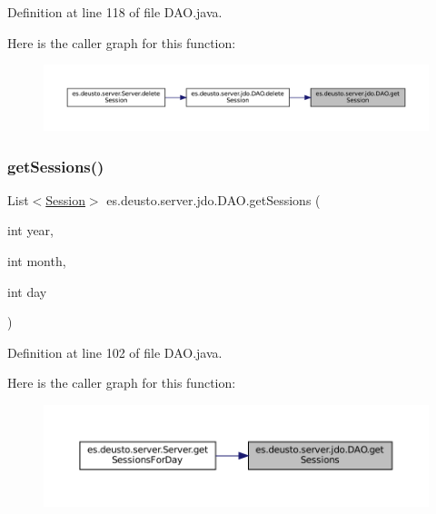 Definition at line 118 of file D\+A\+O.\+java.

Here is the caller graph for this function\+:
\nopagebreak
\begin{figure}[H]
\begin{center}
\leavevmode
\includegraphics[width=350pt]{classes_1_1deusto_1_1server_1_1jdo_1_1_d_a_o_a34f9e5400280bbc1a9fce9143696470e_icgraph}
\end{center}
\end{figure}
\mbox{\label{classes_1_1deusto_1_1server_1_1jdo_1_1_d_a_o_a2f9f9eb5adc37f559d7fefe2da6544f1}} 
\subsubsection{\texorpdfstring{getSessions()}{getSessions()}}
{\footnotesize\ttfamily List$<$\mbox{\hyperlink{classes_1_1deusto_1_1server_1_1jdo_1_1_session}{Session}}$>$ es.\+deusto.\+server.\+jdo.\+D\+A\+O.\+get\+Sessions (\begin{DoxyParamCaption}\item[{int}]{year,  }\item[{int}]{month,  }\item[{int}]{day }\end{DoxyParamCaption})}



Definition at line 102 of file D\+A\+O.\+java.

Here is the caller graph for this function\+:
\nopagebreak
\begin{figure}[H]
\begin{center}
\leavevmode
\includegraphics[width=350pt]{classes_1_1deusto_1_1server_1_1jdo_1_1_d_a_o_a2f9f9eb5adc37f559d7fefe2da6544f1_icgraph}
\end{center}
\end{figure}
\mbox{\label{classes_1_1deusto_1_1server_1_1jdo_1_1_d_a_o_a783758c37658336ee1e4e995a672a0ce}} 

